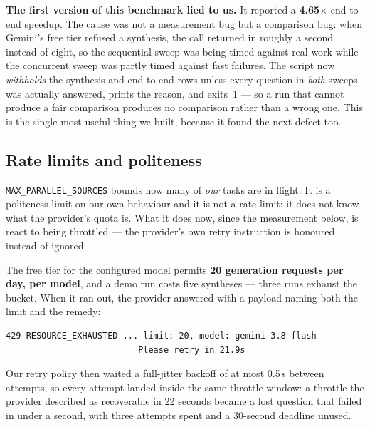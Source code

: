 \documentclass[10pt,a4paper]{article}
\begin{document}
\begin{findingbox}
\textbf{The first version of this benchmark lied to us.} It reported a \textbf{4.65$\times$}
end-to-end speedup. The cause was not a measurement bug but a comparison bug: when Gemini's free
tier refused a synthesis, the call returned in roughly a second instead of eight, so the
sequential sweep was being timed against real work while the concurrent sweep was partly timed
against fast failures. The script now \emph{withholds} the synthesis and end-to-end rows unless
every question in \emph{both} sweeps was actually answered, prints the reason, and exits~1 --- so
a run that cannot produce a fair comparison produces no comparison rather than a wrong one. This
is the single most useful thing we built, because it found the next defect too.
\end{findingbox}

\subsection{Rate limits and politeness}
\label{sec:politeness}

\texttt{MAX\_PARALLEL\_SOURCES} bounds how many of \emph{our} tasks are in flight. It is a
politeness limit on our own behaviour and it is not a rate limit: it does not know what the
provider's quota is. What it does now, since the measurement below, is react to being throttled
--- the provider's own retry instruction is honoured instead of ignored.

The free tier for the configured model permits \textbf{20 generation requests per day, per
model}, and a demo run costs five syntheses --- three runs exhaust the bucket. When it ran out,
the provider answered with a payload naming both the limit and the remedy:

\begin{lstlisting}[style=python,numbers=none,caption={The provider's own words, abridged. The
hint is precise, and until the fix below our policy ignored all of it.},captionpos=b]
429 RESOURCE_EXHAUSTED ... limit: 20, model: gemini-3.8-flash
                          Please retry in 21.9s
\end{lstlisting}

Our retry policy then waited a full-jitter backoff of at most 0.5\,s between attempts, so every
attempt landed inside the same throttle window: a throttle the provider described as recoverable
in 22 seconds became a lost question that failed in under a second, with three attempts spent and
a 30-second deadline unused.
\end{document}

